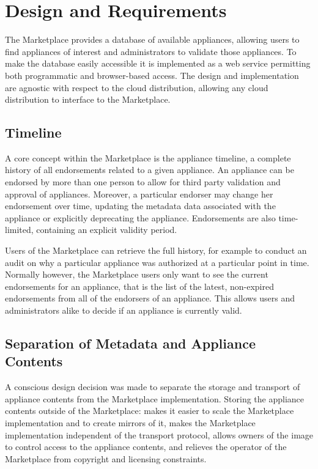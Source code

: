 \section{Design and Requirements}
\label{sec:design}

The Marketplace provides a database of available appliances, allowing
users to find appliances of interest and administrators to validate
those appliances.  To make the database easily accessible it is
implemented as a web service permitting both programmatic and
browser-based access.  The design and implementation are agnostic with
respect to the cloud distribution, allowing any cloud distribution to
interface to the Marketplace\@.

\subsection{Timeline}

A core concept within the Marketplace is the appliance timeline, a
complete history of all endorsements related to a given appliance.  An
appliance can be endorsed by more than one person to allow for third
party validation and approval of appliances.  Moreover, a particular
endorser may change her endorsement over time, updating the metadata
data associated with the appliance or explicitly deprecating the
appliance.  Endorsements are also time-limited, containing an explicit
validity period.

Users of the Marketplace can retrieve the full history, for example to
conduct an audit on why a particular appliance was authorized at a
particular point in time.  Normally however, the Marketplace users
only want to see the current endorsements for an appliance, that is
the list of the latest, non-expired endorsements from all of the
endorsers of an appliance.  This allows users and administrators alike
to decide if an appliance is currently valid.

\subsection{Separation of Metadata and Appliance Contents}

A conscious design decision was made to separate the storage and
transport of appliance contents from the Marketplace implementation.
Storing the appliance contents outside of the Marketplace: makes it
easier to scale the Marketplace implementation and to create mirrors
of it, makes the Marketplace implementation independent of the
transport protocol, allows owners of the image to control access to
the appliance contents, and relieves the operator of the Marketplace
from copyright and licensing constraints.

